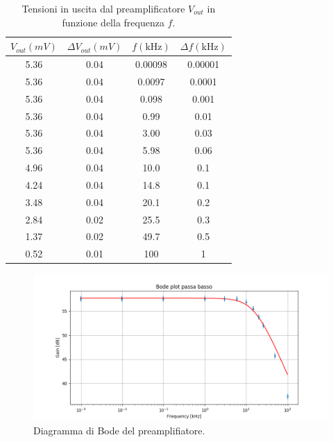 \documentclass[10pt,a4paper]{article}
\begin{document}
\begin{table}[!htb]\centering
\begin{tabular}{|c|c|c|c|}
\hline
$V_{out} (mV)$ & $\Delta V_{out} (mV)$ & $f (\mbox{kHz})$ & $\Delta f (\mbox{kHz})$\\ 
\hline
5.36 & 0.04 & 0.00098 & 0.00001\\
5.36 & 0.04 & 0.0097 & 0.0001\\
5.36 & 0.04 & 0.098 & 0.001\\
5.36 & 0.04 & 0.99 & 0.01\\
5.36 & 0.04 & 3.00 & 0.03\\
5.36 & 0.04 & 5.98 & 0.06\\
4.96 & 0.04 & 10.0 & 0.1\\
4.24 & 0.04 & 14.8 & 0.1\\
3.48 & 0.04 & 20.1 & 0.2\\
2.84 & 0.02 & 25.5 & 0.3\\
1.37 & 0.02 & 49.7 & 0.5\\
0.52 & 0.01 & 100 & 1\\
\hline
\end{tabular}
\caption{Tensioni in uscita dal preamplificatore $V_{out}$ in funzione della frequenza $f$.}
\label{tabellaBode1}
\end{table}

\begin{figure}[!htb]
\centering
\includegraphics[scale=.7]{bodeBasso.png}
\caption{Diagramma di Bode del preamplifiatore.\label{bode}}
\end{figure}

\end{document}

